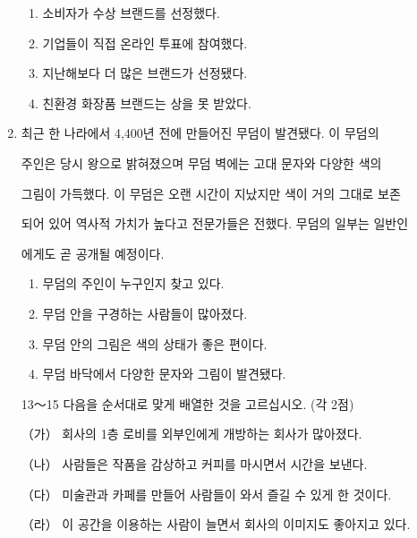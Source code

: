 \documentclass[12pt]{article}
\begin{document}
\begin{enumerate}[1.]
\begin{mdframed}
    \end{mdframed}

    \begin{enumerate}[1)]
        \item 소비자가 수상 브랜드를 선정했다.
        \item 기업들이 직접 온라인 투표에 참여했다.
        \item 지난해보다 더 많은 브랜드가 선정됐다.
        \item 친환경 화장품 브랜드는 상을 못 받았다.
    \end{enumerate}


    \item

    \begin{mdframed}

    최근 한 나라에서 4,400년 전에 만들어진 무덤이 발견됐다. 이 무덤의

    주인은 당시 왕으로 밝혀졌으며 무덤 벽에는 고대 문자와 다양한 색의

    그림이 가득했다. 이 무덤은 오랜 시간이 지났지만 색이 거의 그대로 보존

    되어 있어 역사적 가치가 높다고 전문가들은 전했다. 무덤의 일부는 일반인

    에게도 곧 공개될 예정이다.

    \end{mdframed}

    \begin{enumerate}[1)]
        \item 무덤의 주인이 누구인지 찾고 있다.
        \item 무덤 안을 구경하는 사람들이 많아졌다.
        \item 무덤 안의 그림은 색의 상태가 좋은 편이다.
        \item 무덤 바닥에서 다양한 문자와 그림이 발견됐다.
    \end{enumerate}




    \item [13～15] 다음을 순서대로 맞게 배열한 것을 고르십시오. (각 2점)

    \begin{mdframed}
    （가） 회사의 1층 로비를 외부인에게 개방하는 회사가 많아졌다.

    （나） 사람들은 작품을 감상하고 커피를 마시면서 시간을 보낸다.

    （다） 미술관과 카페를 만들어 사람들이 와서 즐길 수 있게 한 것이다.

    （라） 이 공간을 이용하는 사람이 늘면서 회사의 이미지도 좋아지고 있다.
    \end{mdframed}


\end{enumerate}
\end{document}
